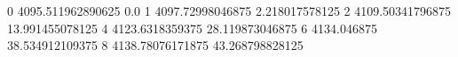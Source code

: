 0 4095.511962890625 0.0
1 4097.72998046875 2.218017578125
2 4109.50341796875 13.991455078125
4 4123.6318359375 28.119873046875
6 4134.046875 38.534912109375
8 4138.78076171875 43.268798828125
